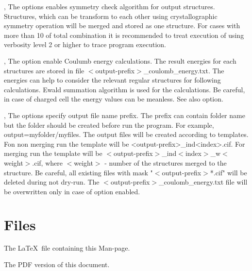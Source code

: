 \documentclass[a4paper,english]{article}
\begin{document}
\begin{Description}
\item[\Opt{-m}, \Opt{\Dd merge-by-distance}]
      The options enables symmetry check algorithm for output structures. Structures, which can be transform to each other using crystallographic symmetry operation will be merged and stored as one structure. For cases with more than 10 of  total combination it is recommended to treat execution of  using verbosity level 2 or higher to trace program execution.

\item[\Opt{-q}, \Opt{\Dd coulomb-energy}] 
      The option enable Coulumb energy calculations. The result energies for each structures are stored in file $<$output-prefix$>$\_coulomb\_energy.txt. The energies can help to consider the relevant regular structures for following calculations. Ewald summation algorithm is used for the calculations. Be careful, in case of charged cell the energy values can be meanless. See also  option.
      
\item[\OptArg{-o }{output-prefix}, \OptArg{\Dd output=}{output-prefix}]
      The options specify output file name prefix. The prefix can contain folder name but the folder should be created before run the program. For example, \Dd output=myfolder/myfiles. The output files will be created according to templates. Fon non merging run the template will be <output-prefix>\_ind<index>.cif. For merging run the template will be $<$output-prefix$>$\_ind$<$index$>$\_w$<$weight$>$.cif, where $<$weight$>$ - number of the structures merged to the structure. Be careful, all existing files with mask "$<$output-prefix$>$*.cif" will be deleted during not dry-run. The $<$output-prefix$>$\_coulomb\_energy.txt file will be overwritten only in case of  option enabled.

\end{Description}

\section{Files}

\begin{Description}\setlength{\itemsep}{0cm}
\item[\File{somthing}] The \LaTeX\ file containing this Man-page.
\item[\URL{1.pdf}] The PDF version of this document.
\end{Description}
\end{document}
